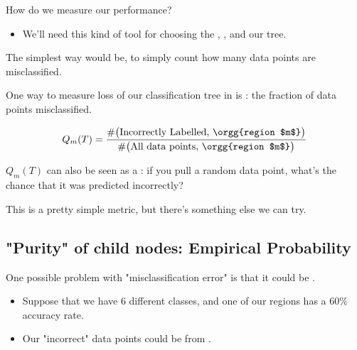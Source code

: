         How do we measure our performance? 
        
        \begin{itemize}
            \item We'll need this kind of tool for choosing the , , and  our tree.
        \end{itemize}
        
        The simplest way would be, to simply count how many data points are misclassified.\\

        \begin{kequation}
            One way to measure loss of our classification tree in  is : the fraction of data points misclassified.

            \begin{equation*}
                Q_m(T) = \frac{\#\big( \text{Incorrectly Labelled, \orgg{region $m$}} \big)}
                {\#\big(\text{All data points, \orgg{region $m$}}\big)}
            \end{equation*}

            $Q_m(T)$ can also be seen as a : if you pull a random data point, what's the chance that it was predicted incorrectly?
        \end{kequation}

        This is a pretty simple metric, but there's something else we can try.\\

    \subsection{"Purity" of child nodes: Empirical Probability}

        One possible problem with "misclassification error" is that it could be .

        \begin{itemize}
            \item \miniex Suppose that we have 6 different classes, and one of our regions has a 60\% accuracy rate.
            
            \item Our "incorrect" data points could be from . 
        \end{itemize}

